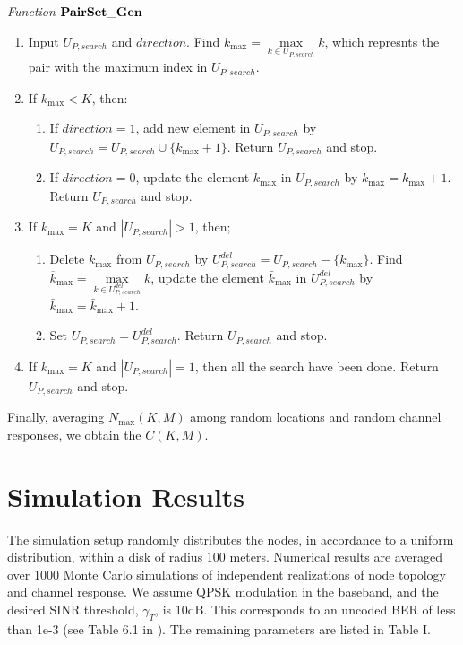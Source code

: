 \documentclass[draftcls,onecolumn,peerview,12pt]{IEEEtran}
\begin{document}
\textit{Function }${\rm{\bf PairSet\_Gen}}$ 
\begin{enumerate}
\item Input $U_{P,search} $ and $direction$. Find $k_{\max } =\mathop {\max }\limits_{k\in U_{P,search} } k$, which represnts the pair with the maximum index in $U_{P,search} $.
\item If $k_{\max}<K$, then:
    \begin{enumerate}
    \item If $direction=1$, add new element in $U_{P,search} $ by
    $U_{P,search} =U_{P,search} \cup \{k_{\max } +1\}$. Return
    $U_{P,search} $ and stop.

    \item If $direction=0$, update the element $k_{\max}$ in $U_{P,search}$ by $k_{\max}=k_{\max}+1$.
    Return $U_{P,search}$ and stop.
    \end{enumerate}
\item If $k_{\max } =K$ and $\left| {U_{P,search} } \right|>1$, then;
    \begin{enumerate}
    \item Delete $k_{\max}$ from $U_{P,search}$ by $U_{P,search}^{del} =U_{P,search}
-\{k_{\max } \}$. Find $\overline k _{\max } =\mathop {\max
}\limits_{k\in U_{P,search}^{del} } k$, update the element
$\bar{k}_{\max}$ in $U_{P,search}^{del} $ by
$\bar{k}_{\max}=\bar{k}_{\max}+1$.

    \item Set $U_{P,search} =U_{P,search}^{del} $. Return $U_{P,search} $ and
stop.
    \end{enumerate}

\item If $k_{\max } =K$ and $\left| {U_{P,search} } \right|=1$, then
all the search have been done. Return $U_{P,search} $ and stop.
\end{enumerate}

Finally, averaging $N_{\max}(K,M)$ among random locations and random
channel responses, we obtain the $C(K,M)$.

\section{Simulation Results}
The simulation setup randomly distributes the nodes, in accordance
to a uniform distribution, within a disk of radius 100 meters.
Numerical results are averaged over 1000 Monte Carlo simulations of
independent realizations of node topology and channel response. We
assume QPSK modulation in the baseband, and the desired SINR
threshold, $\gamma_{T}$, is 10dB. This corresponds to an uncoded BER
of less than 1e-3 (see Table 6.1 in \cite{14_Wireless_Comm}). The
remaining parameters are listed in Table I.
\end{document}
